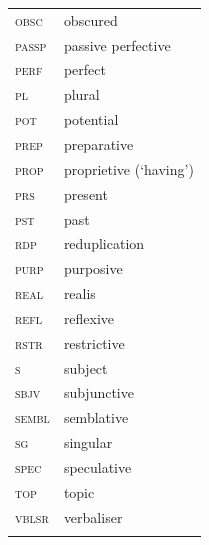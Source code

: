 \documentclass[output=paper,colorlinks,citecolor=brown]{langscibook}
\begin{document}
\begin{tabularx}{.45\textwidth}{@{}lQ@{}}
\textsc{obsc} & obscured \\
\textsc{passp} & passive perfective \\
\textsc{perf} & perfect \\
\textsc{pl} & plural\\
\textsc{pot} & potential\\
\textsc{prep} & preparative \\
\textsc{prop} & proprietive (`having') \\
\textsc{prs} & present \\
\textsc{pst} & past \\
\textsc{rdp} & reduplication \\
\textsc{purp} & purposive \\
\textsc{real} & realis \\
\textsc{refl} & reflexive\\
\textsc{rstr} & restrictive \\ 
\textsc{s} & subject\\
\textsc{sbjv} & subjunctive \\
\textsc{sembl} & semblative \\
\textsc{sg} & singular \\
\textsc{spec} & speculative \\
\textsc{top} & topic \\
\textsc{vblsr} & verbaliser\\
\\
\end{tabularx}


\printbibliography[heading=subbibliography,notkeyword=this]
\end{document}
